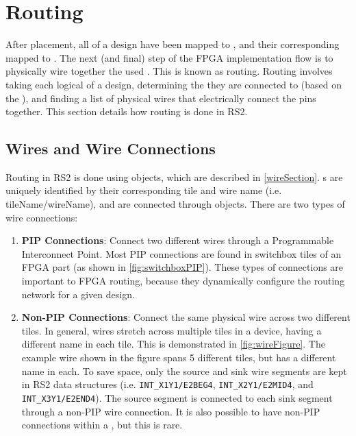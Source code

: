\newpage
\section{Routing} \label{sec:routing}
After placement, all \cells of a design have been mapped to \bels, and their
corresponding \cellpins mapped to \belpins. The next (and final) step of the
FPGA implementation flow is to physically wire together the used \belpins. This
is known as routing. Routing involves taking each logical \net of a design,
determining the \belpins they are connected to (based on the \cellpins), and
finding a list of physical wires that electrically connect the pins together.
This section details how routing is done in RS2.

\subsection{Wires and Wire Connections} \label{wireConnSection}
Routing in RS2 is done using  objects, which are described in
\autoref{wireSection}. s are uniquely identified by their
corresponding tile and wire name (i.e. tileName/wireName), and are connected
through  objects. There are two types of wire connections:

\begin {enumerate}
  \item \textbf{PIP Connections}: Connect two different wires through a
  Programmable Interconnect Point. Most PIP connections are found in
  switchbox tiles of an FPGA part (as shown in \autoref{fig:switchboxPIP}).
  These types of connections are important to FPGA routing, because they
  dynamically configure the routing network for a given design.
   
  \item \textbf{Non-PIP Connections}: Connect the same physical wire across two
  different tiles. In general, wires stretch across multiple tiles in a device, having
  a different name in each tile. This is demonstrated in
  \autoref{fig:wireFigure}. The example wire shown in the figure spans 5
  different tiles, but has a different name in each. To save space, only the
  source and sink wire segments are kept in RS2 data structures
  (i.e. \texttt{INT\_X1Y1/E2BEG4}, \texttt{INT\_X2Y1/E2MID4}, and
  \texttt{INT\_X3Y1/E2END4}). The source segment is connected to each sink
  segment through a non-PIP wire connection. It is also possible to have non-PIP
  connections within a \tile, but this is rare.
\end{enumerate} 

